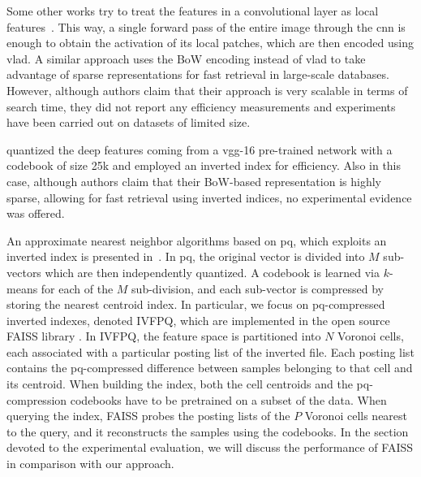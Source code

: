 Some other works try to treat the features in a convolutional layer as local features~\cite{arandjelovic2015netvlad,yue2015exploiting}.
This way, a single forward pass of the entire image through the \gls{cnn} is enough to obtain the activation of its local patches, which are then encoded using \acrfull{vlad}.
A similar approach uses the BoW encoding instead of \gls{vlad} to take advantage of sparse representations for fast retrieval in large-scale databases.
However, although authors claim that their approach is very scalable in terms of search time, they did not report any efficiency measurements and experiments have been carried out on datasets of limited size.

\citet{mohedano2016bags} quantized the deep features coming from a \gls{vgg}-16 pre-trained network with a codebook of size 25k and employed an inverted index for efficiency.
Also in this case, although authors claim that their BoW-based representation is highly sparse, allowing for fast retrieval using inverted indices, no experimental evidence was offered.

An approximate nearest neighbor algorithms based on \acrfull{pq}, which exploits an inverted index is presented in~\cite{jegou2011product}.
In \gls{pq}, the original vector is divided into $M$ sub-vectors which are then independently quantized.
A codebook is learned via $k$-means for each of the $M$ sub-division, and each sub-vector is compressed by storing the nearest centroid index.
In particular, we focus on \gls{pq}-compressed inverted indexes, denoted IVFPQ, which are implemented in the open source FAISS library \cite{johnson2017billion}.
In IVFPQ, the feature space is partitioned into $N$ Voronoi cells, each associated with a particular posting list of the inverted file.
Each posting list contains the \gls{pq}-compressed difference between samples belonging to that cell and its centroid.
When building the index, both the cell centroids and the \gls{pq}-compression codebooks have to be pretrained on a subset of the data.
When querying the index, FAISS probes the posting lists of the $P$ Voronoi cells nearest to the query, and it reconstructs the samples using the codebooks.
In the section devoted to the experimental evaluation, we will discuss the performance of FAISS in comparison with our approach.

